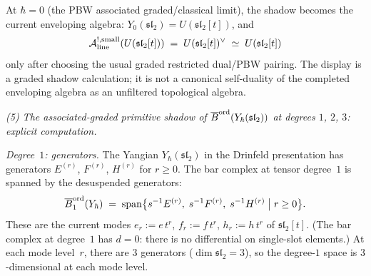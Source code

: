 \begin{computation}
At $\hbar = 0$ (the PBW associated graded/classical limit), the
shadow becomes the current enveloping algebra:
\(Y_0(\mathfrak{sl}_2)=U(\mathfrak{sl}_2[t])\), and
\[
\mathcal{A}^{!,\mathrm{small}}_{\mathrm{line}}(U(\mathfrak{sl}_2[t]))
\;=\;
U(\mathfrak{sl}_2[t])^\vee
\;\simeq\;
U(\mathfrak{sl}_2[t])
\]
only after choosing the usual graded restricted dual/PBW pairing.  The
display is a graded shadow calculation; it is not a canonical
self-duality of the completed enveloping algebra as an unfiltered
topological algebra.

\medskip
\noindent\emph{(5) The associated-graded primitive shadow of
$\overline{B}^{\mathrm{ord}}(Y_\hbar(\mathfrak{sl}_2))$
at degrees $1$, $2$, $3$: explicit computation.}

\emph{Degree~$1$: generators.}\enspace
The Yangian $Y_\hbar(\mathfrak{sl}_2)$ in the Drinfeld
presentation has generators $E^{(r)}$, $F^{(r)}$,
$H^{(r)}$ for $r \ge 0$. The bar complex at tensor
degree~$1$ is spanned by the desuspended generators:
\[
\overline{B}^{\mathrm{ord}}_1(Y_\hbar)
\;=\;
\operatorname{span}\bigl\{
s^{-1}E^{(r)},\;s^{-1}F^{(r)},\;s^{-1}H^{(r)}
\;\big|\;r\ge 0\bigr\}.
\]
These are the current modes
$e_r := e\,t^r$, $f_r := f\,t^r$, $h_r := h\,t^r$ of
$\mathfrak{sl}_2[t]$. (The bar complex at degree~$1$
has $d = 0$: there is no differential on single-slot
elements.) At each mode level~$r$, there are $3$
generators ($\dim\mathfrak{sl}_2 = 3$), so the
degree-$1$ space is $3$-dimensional at each mode level.


\end{computation}
